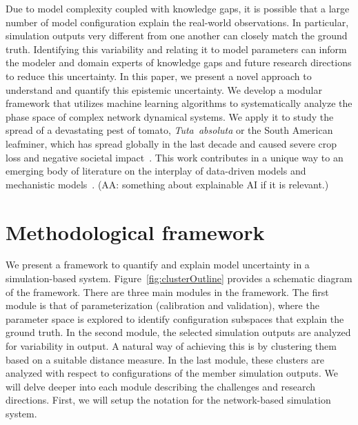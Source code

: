 \documentclass{article}
\newcommand{\aacomment}[1]{({\color{magenta}AA: #1})}
\begin{document}
Due to model complexity coupled with knowledge gaps, it is possible that a
large number of model configuration explain the real-world observations. In
particular, simulation outputs very different from one another can closely
match the ground truth. Identifying this variability and relating it to
model parameters can inform the modeler and domain experts of knowledge
gaps and future research directions to reduce this uncertainty. In this
paper, we present a novel approach to understand and quantify this
epistemic uncertainty. We develop a modular framework that utilizes machine
learning algorithms to systematically analyze the phase space of complex
network dynamical systems. We apply it to study the spread of a devastating
pest of tomato, \emph{Tuta~absoluta} or the South American leafminer, which
has spread globally in the last decade and caused severe crop loss and
negative societal impact~\cite{biondi2017}. This work contributes in a
unique way to an emerging body of literature on the interplay of
data-driven models and mechanistic
models~\cite{lamperti2018agent}. \aacomment{something
about explainable AI if it is relevant.}

\section{Methodological framework}\label{sec:methods}
\newcommand{\conSpace}{\mathcal{C}}
\newcommand{\selectedConSpace}{\mathcal{C}_s}
\newcommand{\simSpace}{\mathcal{S}}
\newcommand{\selectedSimSpace}{\mathcal{S}_s}
\newcommand{\loss}{L_g}

We present a framework to quantify and explain model uncertainty in a
simulation-based system. Figure~\ref{fig:clusterOutline} provides a
schematic diagram of the framework.  There are three main modules in the
framework. The first module is that of parameterization (calibration and
validation), where the parameter space is explored to identify
configuration subspaces that explain the ground truth. In the second
module, the selected simulation outputs are analyzed for variability in
output. A natural way of achieving this is by clustering them based on a
suitable distance measure. In the last module, these clusters are analyzed
with respect to configurations of the member simulation outputs.  We will
delve deeper into each module describing the challenges and research
directions. First, we will setup the notation for the network-based
simulation system.
\end{document}
